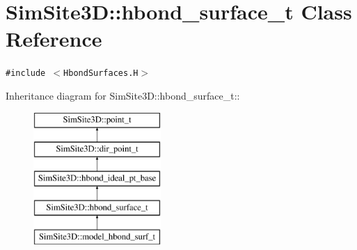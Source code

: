 \section{SimSite3D::hbond\_\-surface\_\-t Class Reference}
\label{classSimSite3D_1_1hbond__surface__t}
{\tt \#include $<$Hbond\-Surfaces.H$>$}

Inheritance diagram for SimSite3D::hbond\_\-surface\_\-t::\begin{figure}[H]
\begin{center}
\leavevmode
\includegraphics[height=5cm]{classSimSite3D_1_1hbond__surface__t}
\end{center}
\end{figure}
